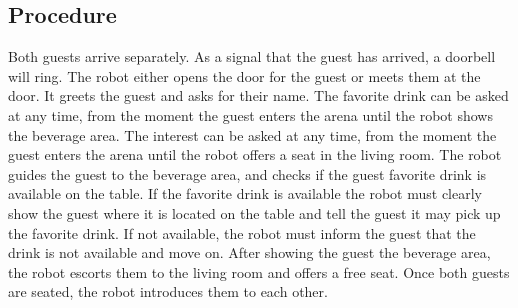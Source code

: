 \subsection*{Procedure}
Both guests arrive separately. As a signal that the guest has arrived, a doorbell will ring.
The robot either opens the door for the guest or meets them at the door.
It greets the guest and asks for their name.
The favorite drink can be asked at any time, from the moment the guest enters the arena until the robot shows the beverage area.
The interest can be asked at any time, from the moment the guest enters the arena until the robot offers a seat in the living room.
The robot guides the guest to the beverage area, and checks if the guest favorite drink is available on the table.
If the favorite drink is available the robot must clearly show the guest where it is located on the table and tell the guest it may pick up the favorite drink. If not available, the robot must inform the guest that the drink is not available and move on.
After showing the guest the beverage area, the robot escorts them to the living room and offers a free seat. 
Once both guests are seated, the robot introduces them to each other.
